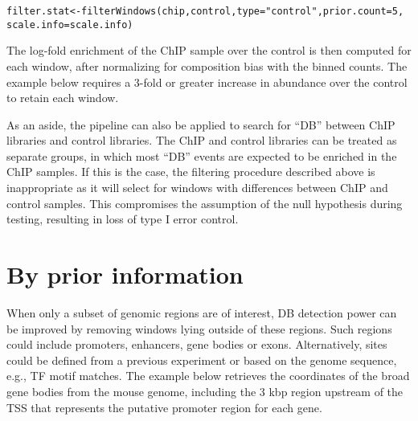 \documentclass{report}\usepackage[]{graphicx}\usepackage[usenames,dvipsnames]{color}
\newcommand{\hlnum}[1]{\textcolor[rgb]{0.816,0.125,0.439}{#1}}%
\newcommand{\hlstr}[1]{\textcolor[rgb]{0.251,0.627,0.251}{#1}}%
\newcommand{\hlopt}[1]{\textcolor[rgb]{0,0,0}{#1}}%
\newcommand{\hlstd}[1]{\textcolor[rgb]{0.251,0.251,0.251}{#1}}%
\newcommand{\hlkwb}[1]{\textcolor[rgb]{0,0,0}{#1}}%
\newcommand{\hlkwc}[1]{\textcolor[rgb]{0.251,0.251,0.251}{#1}}%
\newcommand{\hlkwd}[1]{\textcolor[rgb]{0.878,0.439,0.125}{#1}}%
\newenvironment{knitrout}{}{} %
\begin{document}
\begin{knitrout}
\color{fgcolor}\begin{kframe}
\begin{alltt}
\hlstd{filter.stat} \hlkwb{<-} \hlkwd{filterWindows}\hlstd{(chip, control,} \hlkwc{type}\hlstd{=}\hlstr{"control"}\hlstd{,} \hlkwc{prior.count}\hlstd{=}\hlnum{5}\hlstd{,}
                             \hlkwc{scale.info}\hlstd{=scale.info)}
\end{alltt}
\end{kframe}
\end{knitrout}

The log-fold enrichment of the ChIP sample over the control is then computed for each window, after normalizing for composition bias with the binned counts.
The example below requires a 3-fold or greater increase in abundance over the control to retain each window.

\begin{knitrout}
\color{fgcolor}
\end{knitrout}

As an aside, the  pipeline can also be applied to search for ``DB'' between ChIP libraries and control libraries. 
The ChIP and control libraries can be treated as separate groups, in which most ``DB'' events are expected to be enriched in the ChIP samples. 
If this is the case, the filtering procedure described above is inappropriate as it will select for windows with differences between ChIP and control samples. 
This compromises the assumption of the null hypothesis during testing, resulting in loss of type I error control.


\section{By prior information}
When only a subset of genomic regions are of interest, DB detection power can be improved by removing windows lying outside of these regions. 
Such regions could include promoters, enhancers, gene bodies or exons. 
Alternatively, sites could be defined from a previous experiment or based on the genome sequence, e.g., TF motif matches.
The example below retrieves the coordinates of the broad gene bodies from the mouse genome, including the 3 kbp region upstream of the TSS that represents the putative promoter region for each gene. 
\end{document}
